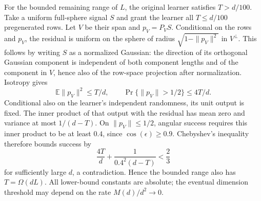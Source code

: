 For the bounded remaining range of \(L\), the original learner
satisfies \(T>d/100\).  Take a uniform full-sphere signal \(S\) and
grant the learner all \(T\le d/100\) pregenerated rows.  Let \(V\)
be their span and \(p_V=P_VS\).  Conditional on the rows and \(p_V\),
the residual is uniform on the sphere of radius
\(\sqrt{1-\|p_V\|^2}\) in \(V^\perp\).  This follows by writing
\(S\) as a normalized Gaussian: the direction of its orthogonal
Gaussian component is independent of both component lengths and of
the component in \(V\), hence also of the row-space projection after
normalization.  Isotropy gives
\[
 \mathbb E\|p_V\|^2\le T/d,\qquad
 \Pr\{\|p_V\|>1/2\}\le4T/d.
\]
Conditional also on the learner's independent randomness, its unit
output is fixed.  The inner product of that output with the residual
has mean zero and variance at most \(1/(d-T)\).  On
\(\|p_V\|\le1/2\), angular success requires this inner product to
be at least \(0.4\), since \(\cos(\epsilon)\ge0.9\).
Chebyshev's inequality therefore bounds success by
\begin{equation}\label{l:finite-entropy:linear}
 \frac{4T}{d}+\frac1{0.4^2(d-T)}<\frac23
\end{equation}
for sufficiently large \(d\), a contradiction.  Hence the bounded
range also has \(T=\Omega(dL)\).  All lower-bound constants are
absolute; the eventual dimension threshold may depend on the rate
\(M(d)/d^2\to0\).
